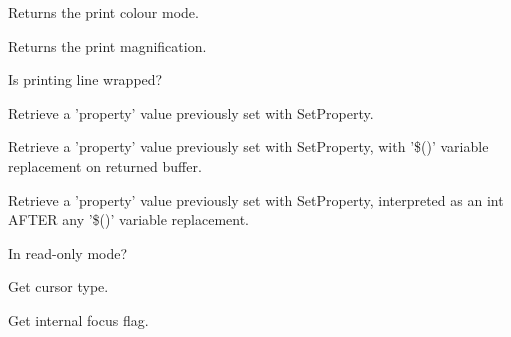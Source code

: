 Returns the print colour mode.


\label{wxstyledtextctrlgetprintmagnification}


Returns the print magnification.


\label{wxstyledtextctrlgetprintwrapmode}


Is printing line wrapped?


\label{wxstyledtextctrlgetproperty}


Retrieve a 'property' value previously set with SetProperty.


\label{wxstyledtextctrlgetpropertyexpanded}


Retrieve a 'property' value previously set with SetProperty,
with '\$()' variable replacement on returned buffer.


\label{wxstyledtextctrlgetpropertyint}


Retrieve a 'property' value previously set with SetProperty,
interpreted as an int AFTER any '\$()' variable replacement.


\label{wxstyledtextctrlgetreadonly}


In read-only mode?


\label{wxstyledtextctrlgetstccursor}


Get cursor type.


\label{wxstyledtextctrlgetstcfocus}


Get internal focus flag.


\label{wxstyledtextctrlgetscrollwidth}

